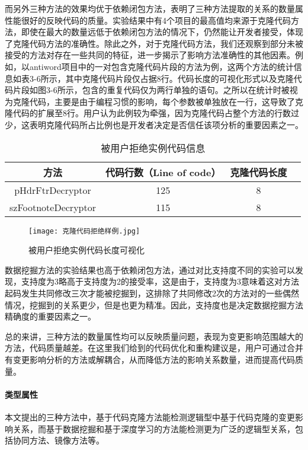 而另外三种方法的效果均优于依赖闭包方法，表明了三种方法提取的关系的数量属性能很好的反映代码的质量。实验结果中有4个项目的最高值均来源于克隆代码方法，即使在最大的数量远低于依赖闭包方法的情况下，仍然能让开发者接受，体现了克隆代码方法的准确性。除此之外，对于克隆代码方法，我们还观察到部分未被接受的方法对存在一些共同的特征，进一步揭示了影响方法准确性的其他因素。例如，以antiword项目中的一对包含克隆代码片段的方法为例，这两个方法的统计信息如表3-6所示，其中克隆代码片段仅占据8行。代码长度的可视化形式以及克隆代码片段如图3-6所示，包含的重复代码仅为两行单独的语句。之所以在统计时被视为克隆代码，主要是由于编程习惯的影响，每个参数被单独放在一行，这导致了克隆代码的扩展至8行。用户认为此例较为牵强，因为克隆代码占整个方法的行数过少，这表明克隆代码所占比例也是开发者决定是否信任该项分析的重要因素之一。

\begin{table}[htbp]
\caption{被用户拒绝实例代码信息}
\vspace{0.5em}\centering\wuhao
\begin{tabular}{cccc}
\toprule
方法 & 代码行数（Line of code）  & 克隆代码长度\\
\midrule
pHdrFtrDecryptor & 125 & 8 \\
szFootnoteDecryptor  & 115 & 8 \\
\bottomrule
\end{tabular}
\end{table}

\begin{figure}[h]
\centering
\texttt{[image: 克隆代码拒绝样例.jpg]}
\caption{被用户拒绝实例代码长度可视化}
\end{figure}

数据挖掘方法的实验结果也高于依赖闭包方法，通过对比支持度不同的实验可以发现，支持度为3略高于支持度为2的接受率，这是由于，支持度为3意味着这对方法起码发生共同修改三次才能被挖掘到，这排除了共同修改2次的方法对的一些偶然情况，挖掘到的关系更少，但是也更为精准。因此，支持度也是决定数据挖掘方法精确度的重要因素之一。

总的来讲，三种方法的数量属性均可以反映质量问题，表现为变更影响范围越大的方法，代码质量越差。在这里我们给到的代码优化和重构建议是，用户可通过合并有变更影响分析的方法或解耦合，从而降低方法的影响关系数量，进而提高代码质量。


\paragraph{类型属性} 本文提出的三种方法中，基于代码克隆方法能检测逻辑型中基于代码克隆的变更影响关系，而基于数据挖掘和基于深度学习的方法能检测更为广泛的逻辑型关系，包括协同方法、镜像方法等。

